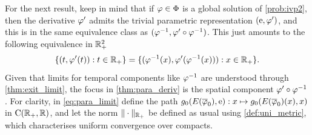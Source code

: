 For the next result, keep in mind that if $\varphi\in\Phi$ is a global solution of \autoref{prob:ivp2}, then the derivative $\varphi'$ admits the trivial parametric representation $(\mathrm{e},\varphi')$, and this is in the same equivalence class as $(\varphi^{-1},\varphi'\circ\varphi^{-1})$. This just amounts to the following equivalence in $\mathbb{R}_+^2$
\begin{equation}\label{eq:deriv_equiv}
    \{(t,\varphi'(t)):t\in\mathbb{R}_+\} = \{(\varphi^{-1}(x),\varphi'(\varphi^{-1}(x))):x\in\mathbb{R}_+\}.
\end{equation}
Given that limits for temporal components like $\varphi^{-1}$ are understood through \autoref{thm:exit_limit}, the focus in \autoref{thm:para_deriv} is the spatial component $\varphi'\circ\varphi^{-1}$. For clarity, in \autoref{eq:para_limit} define the path $g_0(E(\overline{\varphi}_0),\mathrm{e}):x\mapsto g_0(E(\overline{\varphi}_0)(x),x)$ in $\mathrm{C}(\mathbb{R}_+,\mathbb{R})$, and let the norm $\Vert\cdot\Vert_{\mathbb{R}_+}$ be defined as usual using \autoref{def:uni_metric}, which characterises uniform convergence over compacts.


